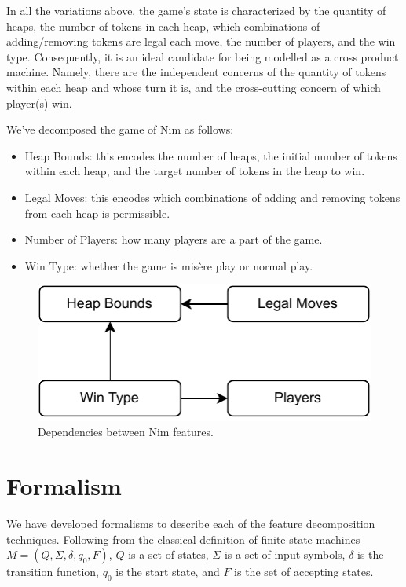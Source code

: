 \documentclass[sigplan,anonymous,review]{acmart}
\begin{document}
In all the variations above, the game's state is characterized by the quantity of heaps, the number of tokens in each heap, which combinations of adding/removing tokens are legal each move, the number of players, and the win type. Consequently, it is an ideal candidate for being modelled as a cross product machine. Namely, there are the independent concerns of the quantity of tokens within each heap and whose turn it is, and the cross-cutting concern of which player(s) win.

We've decomposed the game of Nim as follows:
\begin{itemize}
    \item Heap Bounds: this encodes the number of heaps, the initial number of tokens within each heap, and the target number of tokens in the heap to win. 
    \item Legal Moves: this encodes which combinations of adding and removing tokens from each heap is permissible.
    \item Number of Players: how many players are a part of the game.
    \item Win Type: whether the game is mis\`{e}re play or normal play. 
\end{itemize}

\begin{figure}
    \centering
    \includegraphics[width=0.7\linewidth]{figures/NimFeatures.pdf}
    \caption{Dependencies between Nim features.}
    \label{fig:nimDependencies}
\end{figure}

\section{Formalism}\label{sec:formal}
We have developed formalisms to describe each of the feature decomposition techniques. Following from the classical definition of finite state machines $M = (Q, \Sigma, \delta, q_0, F)$, $Q$ is a set of states, $\Sigma$ is a set of input symbols, $\delta$ is the transition function, $q_0$ is the start state, and $F$ is the set of accepting states. \\
\end{document}
